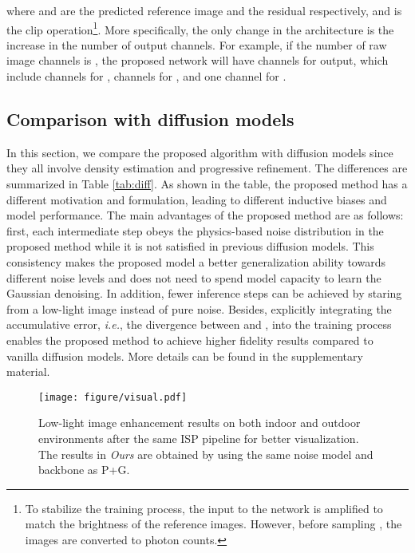 \documentclass[10pt,twocolumn,letterpaper]{article}
\def\ie{\textit{i.e.}}
\begin{document}
where  and  are the predicted reference image and the residual respectively, and  is the  clip operation\footnote{To stabilize the training process, the input to the network is amplified to match the brightness of the reference images. However, before sampling , the images are converted to photon counts.}. More specifically, the only change in the architecture is the increase in the number of output channels. For example, if the number of raw image channels is , the proposed network will have  channels for output, which include  channels for ,  channels for , and one channel for .

\subsection{Comparison with diffusion models}
In this section, we compare the proposed algorithm with diffusion models \cite{song2020denoising, ho2020denoising, saharia2022image} since they all involve density estimation and progressive refinement. The differences are summarized in Table \ref{tab:diff}. As shown in the table, the proposed method has a different motivation and formulation, leading to different inductive biases and model performance. The main advantages of the proposed method are as follows: first, each intermediate step  obeys the physics-based noise distribution in the proposed method while it is not satisfied in previous diffusion models. 
This consistency makes the proposed model a better generalization ability towards different noise levels and does not need to spend model capacity to learn the Gaussian denoising. 
In addition, fewer inference steps can be achieved by staring from a low-light image instead of pure noise.
Besides, explicitly integrating the accumulative error, \ie, the divergence between  and , into the training process enables the proposed method to achieve higher fidelity results compared to vanilla diffusion models. More details can be found in the supplementary material.
 
\begin{figure*}[t]
    \centering
\texttt{[image: figure/visual.pdf]} 
    \vspace{-0.45cm}
    \caption{Low-light image enhancement results on both indoor and outdoor environments after the same ISP pipeline for better visualization. The results in \textit{Ours} are obtained by using the same noise model and backbone as P+G. }
    \label{fig:vis_res}
\end{figure*}
\end{document}
